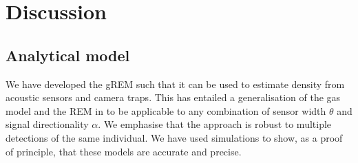 %

                  
                  
\section{Discussion}

\subsection{Analytical model}

We have developed the gREM such that it can be used to estimate density from acoustic sensors and camera traps.
This has entailed a generalisation of the gas model and the REM in \cite{rowcliffe2008estimating} to be applicable to any combination of sensor width  $\theta$ and signal directionality $\alpha$.
We emphasise that the approach is robust to multiple detections of the same individual.
We have used simulations to show, as a proof of principle, that these models are accurate and precise. 

